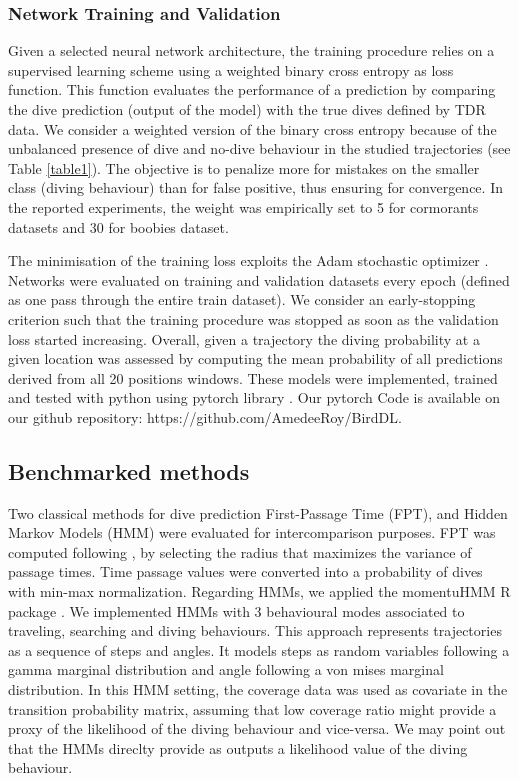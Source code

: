 \documentclass{article}
\begin{document}
\subsubsection{Network Training and Validation}
Given a selected neural network architecture, the training procedure relies on a supervised learning scheme using a weighted binary cross entropy as loss function.
This function evaluates the performance of a prediction by comparing the dive prediction (output of the model) with the true dives defined by TDR data. We consider a weighted version of the binary cross entropy because of the unbalanced presence of dive and no-dive behaviour in the studied trajectories (see Table \ref{table1}). The objective is to penalize more  for mistakes on the smaller class (diving behaviour) than for false positive, thus ensuring for convergence. In the reported experiments, the weight was empirically set to 5 for cormorants datasets and 30 for boobies dataset.

The minimisation of the training loss exploits the  Adam stochastic optimizer \citep{kingma_adam_2015}.
Networks were evaluated on training and validation datasets every epoch (defined as one pass through the entire train dataset). We consider an early-stopping criterion such that the training procedure was stopped as soon as the validation loss started increasing.
Overall, given a trajectory the diving probability at a given location was assessed by computing the mean probability of all predictions derived from all 20 positions windows.
These models were implemented, trained and tested with python using pytorch library \citep{paskze_pytorch_2019}. Our pytorch Code is available on our github repository: https://github.com/AmedeeRoy/BirdDL.

\subsection{Benchmarked methods}
Two classical methods for dive prediction First-Passage Time (FPT), and Hidden Markov Models (HMM) were evaluated for intercomparison purposes.
FPT was computed following \citep{fauchald_using_2003}, by selecting the radius that maximizes the variance of passage times. Time passage values were converted into a probability of dives with min-max normalization.
Regarding HMMs, we applied the momentuHMM R package \citep{mcclintock_momentuhmm_2018}. We implemented HMMs with 3 behavioural modes associated to traveling, searching and diving behaviours. This approach represents trajectories as a sequence of steps and angles. It models steps as random variables following a gamma marginal distribution and angle following a von mises marginal distribution.
In this HMM setting, the coverage data was used as covariate in the transition probability matrix, assuming that low coverage ratio might provide a proxy of the likelihood of the diving behaviour and vice-versa. We may point out that the HMMs direclty provide as outputs a likelihood value of the diving behaviour.
\end{document}
